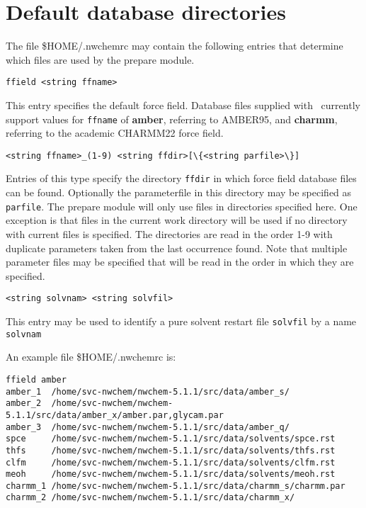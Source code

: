 \section{Default database directories}

The file \$HOME/.nwchemrc may contain the following entries that determine
which files are used by the prepare module.

\begin{verbatim}
ffield <string ffname>
\end{verbatim}

This entry specifies the default force field. Database files supplied with
\nwchem\ currently support values for \verb+ffname+ of {\bf amber}, referring 
to AMBER95, and {\bf charmm}, referring to the academic CHARMM22 force field.

\begin{verbatim}
<string ffname>_(1-9) <string ffdir>[\{<string parfile>\}]
\end{verbatim}

Entries of this type specify the directory \verb+ffdir+ in which force field 
database files can be found. Optionally the parameterfile in this directory
may be specified as \verb+parfile+. 
The prepare module will only use files in directories
specified here. One exception is that files in the current work directory
will be used if no directory with current files is specified. The directories
are read in the order 1-9 with duplicate parameters taken from the last
occurrence found. Note that multiple parameter files may be specified that will
be read in the order in which they are specified.

\begin{verbatim}
<string solvnam> <string solvfil>
\end{verbatim}

This entry may be used to identify a pure solvent restart file \verb+solvfil+
by a name \verb+solvnam+

An example file \$HOME/.nwchemrc is:

\begin{verbatim}
ffield amber
amber_1  /home/svc-nwchem/nwchem-5.1.1/src/data/amber_s/
amber_2  /home/svc-nwchem/nwchem-5.1.1/src/data/amber_x/amber.par,glycam.par
amber_3  /home/svc-nwchem/nwchem-5.1.1/src/data/amber_q/
spce     /home/svc-nwchem/nwchem-5.1.1/src/data/solvents/spce.rst
thfs     /home/svc-nwchem/nwchem-5.1.1/src/data/solvents/thfs.rst
clfm     /home/svc-nwchem/nwchem-5.1.1/src/data/solvents/clfm.rst
meoh     /home/svc-nwchem/nwchem-5.1.1/src/data/solvents/meoh.rst
charmm_1 /home/svc-nwchem/nwchem-5.1.1/src/data/charmm_s/charmm.par
charmm_2 /home/svc-nwchem/nwchem-5.1.1/src/data/charmm_x/
\end{verbatim}

